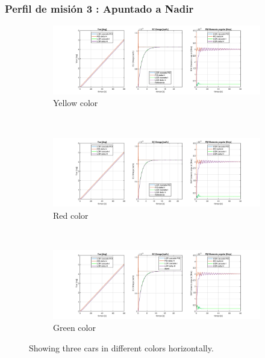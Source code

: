\subsubsection{Perfil de misión 3 : Apuntado a Nadir}


\begin{figure}
	\centering
	\begin{subfigure}{1.2\linewidth}
		\includegraphics[width=\linewidth]{imagenes/resultados/Nadir/orbit_zero/Compilado.PNG}
		\caption{Yellow color}
		\label{fig:nadir_zero}
	\end{subfigure}\\
	\begin{subfigure}{1.2\linewidth}
		\includegraphics[width=\linewidth]{imagenes/resultados/Nadir/orbit_iss/Compilado.PNG}
		\caption{Red color}
		\label{fig:nadir_iss}
	\end{subfigure}\\
	\begin{subfigure}{1.2\linewidth}
		\includegraphics[width=\linewidth]{imagenes/resultados/Nadir/orbit_polar/Compilado.PNG}
		\caption{Green color}
		\label{fig:nadir_polar}
	\end{subfigure}
	\caption{Showing three cars in different colors horizontally.}
	\label{fig:nadir}
\end{figure}  


